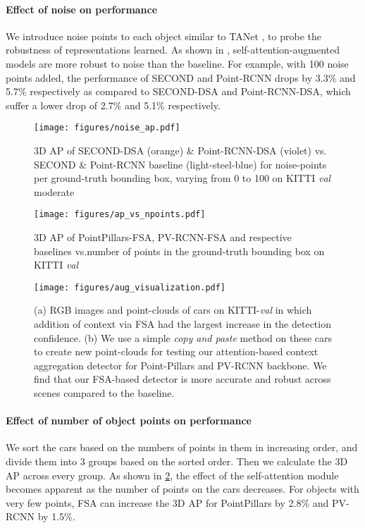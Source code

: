 \documentclass[10pt,twocolumn,letterpaper]{article}
\begin{document}
\paragraph{Effect of noise on performance} We introduce noise points to each object similar to TANet \cite{tanet}, to probe the robustness of  representations learned. As shown in , self-attention-augmented models are more robust to noise than the baseline. For example, with 100 noise points added, the performance of SECOND and Point-RCNN drops by 3.3\% and 5.7\% respectively as compared to SECOND-DSA and Point-RCNN-DSA, which suffer a lower drop of 2.7\% and 5.1\% respectively.
\vspace{-0.4cm}

\begin{figure}[t]
\centering
\texttt{[image: figures/noise\_ap.pdf]}
\caption{3D AP of SECOND-DSA (orange) \& Point-RCNN-DSA (violet) vs. SECOND \& Point-RCNN baseline (light-steel-blue) for noise-points per ground-truth bounding box, varying from 0 to 100 on KITTI \textit{val} moderate}
\label{fig:graph_noise}
\end{figure}

\begin{figure}[t]
\centering
\texttt{[image: figures/ap\_vs\_npoints.pdf]}
\caption{3D AP of PointPillars-FSA, PV-RCNN-FSA and respective baselines vs.number of points in the ground-truth bounding box on KITTI \textit{val}}
\label{fig:ap_vs_numpts}
\vspace{-0.5cm}
\end{figure}

\begin{figure*}[t]
     \centering
     \texttt{[image: figures/aug\_visualization.pdf]}
\caption{(a) RGB images and point-clouds of cars on KITTI-\textit{val} in which addition of context via FSA had the largest increase in the detection confidence. (b) We use a simple \textit{copy and paste} method on these cars to create new point-clouds for testing our attention-based context aggregation detector for Point-Pillars and PV-RCNN backbone. We find that our FSA-based detector is more accurate and robust across scenes compared to the baseline.}
     \label{fig:aug_visualization}
\vspace{-0.5cm}
\end{figure*}


\paragraph{Effect of number of object points on performance}  We sort the cars based on the numbers of points in them in increasing order, and divide them into 3 groups based on the sorted order. Then we calculate the 3D AP across every group. As shown in \cref{fig:ap_vs_numpts}, the effect of the self-attention module becomes apparent as the number of points on the cars decreases. For objects with very few points, FSA can increase the 3D AP for PointPillars by 2.8\% and PV-RCNN by 1.5\%.
\end{document}

